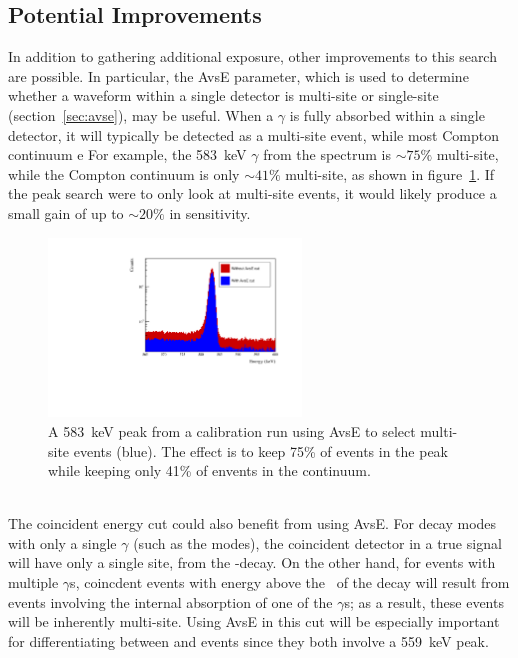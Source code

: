 \documentclass[/main.tex]{subfiles}
\begin{document}
\subsection{Potential Improvements}
In addition to gathering additional exposure, other improvements to this search are possible.
In particular, the AvsE parameter, which is used to determine whether a waveform within a single detector is multi-site or single-site (section~\ref{sec:avse}), may be useful.
When a $\gamma$ is fully absorbed within a single detector, it will typically be detected as a multi-site event, while most Compton continuum e
For example, the 583~keV $\gamma$ from the  spectrum is $\sim75\%$ multi-site, while the Compton continuum is only $\sim41\%$ multi-site, as shown in figure~\ref{fig:avse583}.
If the peak search were to only look at multi-site events, it would likely produce a small gain of up to $\sim20\%$ in sensitivity.
\begin{figure}[tb]
  \centering
  \includegraphics[width=0.6\textwidth]{avse583}
  \caption[583~keV peak with AvsE cut applied]{\label{fig:avse583}
    A 583~keV peak from a  calibration run using AvsE to select multi-site events (blue). The effect is to keep 75\% of events in the peak while keeping only 41\% of envents in the continuum.
  }
\end{figure}
\\
The coincident energy cut could also benefit from using AvsE.
For decay modes with only a single $\gamma$ (such as the  modes), the coincident detector in a true signal will have only a single site, from the \bb -decay.
On the other hand, for events with multiple $\gamma$s, coincdent events with energy above the \Qval\ of the decay will result from events involving the internal absorption of one of the $\gamma$s; as a result, these events will be inherently multi-site.
Using AvsE in this cut will be especially important for differentiating between  and  events since they both involve a 559~keV peak.
\end{document}
